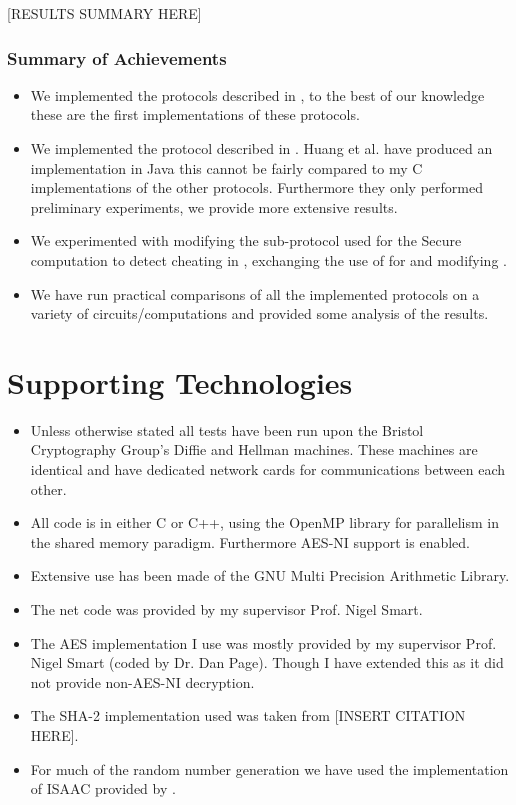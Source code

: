 \documentclass[ %
                    author={Nicholas Tutte},
                supervisor={Prof. Nigel Smart},
                    degree={MEng},
                     title={Secure Two Party Computation},
                  subtitle={A practical comparison of recent protocols},
                      type={Research - GG1K},
                      year={2015} ]{dissertation}
\begin{document}
			  [RESULTS SUMMARY HERE]

			\subsubsection*{Summary of Achievements}
				\begin{itemize}
					\item We implemented the protocols described in \cite{LindellAndPinkas2011, Lindell_CnC_2013}, to the best of our knowledge these are the first implementations of these protocols.
					\item We implemented the protocol described in \cite{Katz_Symm_CnC_2013}. Huang et al. have produced an implementation in Java this cannot be fairly compared to my C implementations of the other protocols. Furthermore they only performed preliminary experiments, we provide more extensive results.
					\item We experimented with modifying the sub-protocol used for the Secure computation to detect cheating in \cite{Lindell_CnC_2013}, exchanging the use of \cite{LindellAndPinkas2011} for \cite{Katz_Symm_CnC_2013} and modifying .
					\item We have run practical comparisons of all the implemented protocols on a variety of circuits/computations and provided some analysis of the results.
				\end{itemize}

		\section*{Supporting Technologies}
			\begin{itemize}
					\item Unless otherwise stated all tests have been run upon the Bristol Cryptography Group's Diffie and Hellman machines. These machines are identical and have dedicated network cards for communications between each other.
					\item All code is in either C or C++, using the OpenMP library for parallelism in the shared memory paradigm. Furthermore AES-NI support is enabled.
					\item Extensive use has been made of the GNU Multi Precision Arithmetic Library.
					\item The net code was provided by my supervisor Prof. Nigel Smart.
					\item The AES implementation I use was mostly provided by my supervisor Prof. Nigel Smart (coded by Dr. Dan Page). Though I have extended this as it did not provide non-AES-NI decryption.
					\item The SHA-2 implementation used was taken from [INSERT CITATION HERE].
					\item For much of the random number generation we have used the implementation of ISAAC provided by \cite{ISAAC_Implementation}.
			\end{itemize}
\end{document}
